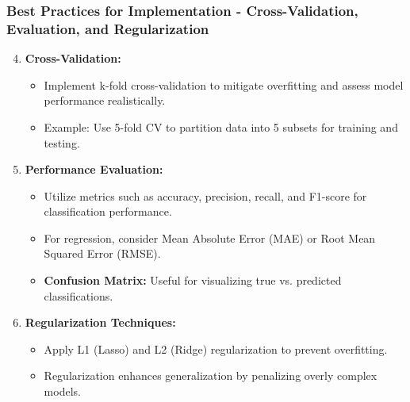 \documentclass[aspectratio=169]{beamer}
\begin{document}
\begin{frame}[fragile]
    \frametitle{Best Practices for Implementation - Cross-Validation, Evaluation, and Regularization}
    \begin{enumerate}
        \setcounter{enumi}{3}
        \item \textbf{Cross-Validation:}
        \begin{itemize}
            \item Implement k-fold cross-validation to mitigate overfitting and assess model performance realistically.
            \item Example: Use 5-fold CV to partition data into 5 subsets for training and testing.
        \end{itemize}
    
        \item \textbf{Performance Evaluation:}
        \begin{itemize}
            \item Utilize metrics such as accuracy, precision, recall, and F1-score for classification performance.
            \item For regression, consider Mean Absolute Error (MAE) or Root Mean Squared Error (RMSE).
            \item \textbf{Confusion Matrix:} Useful for visualizing true vs. predicted classifications.
        \end{itemize}
    
        \item \textbf{Regularization Techniques:}
        \begin{itemize}
            \item Apply L1 (Lasso) and L2 (Ridge) regularization to prevent overfitting.
            \item Regularization enhances generalization by penalizing overly complex models.
        \end{itemize}
    \end{enumerate}
\end{frame}
\end{document}
